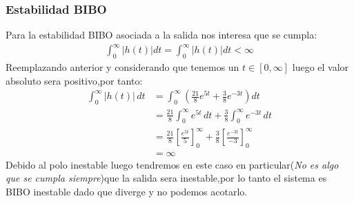 \documentclass[
  11pt,
  letterpaper,
   addpoints,
  answers
  ]{exam}
\begin{document}
\begin{questions}
\begin{solution}
    \subsubsection*{Estabilidad BIBO}
    Para la estabilidad BIBO asociada a la salida nos interesa que se cumpla:
    \begin{align}
        \int_{0}^{\infty}|h(t)|dt= \int_{0}^{\infty} |h(t)| dt < \infty
    \end{align}
    Reemplazando anterior y considerando que tenemos un $t \in [0,\infty]$ luego el valor absoluto sera positivo,por tanto:
    \begin{align}
        \int_{0}^{\infty} |h(t)| \, dt &= \int_{0}^{\infty} \left( \frac{21}{8} e^{5t} + \frac{3}{8} e^{-3t} \right) dt \\
        &= \frac{21}{8} \int_{0}^{\infty} e^{5t} \, dt + \frac{3}{8} \int_{0}^{\infty} e^{-3t} \, dt \\
        &= \frac{21}{8} \left[ \frac{e^{5t}}{5} \right]_{0}^{\infty} + \frac{3}{8} \left[ \frac{e^{-3t}}{-3} \right]_{0}^{\infty} \\
        &= \infty
    \end{align}
    Debido al polo inestable luego tendremos en este caso en particular(\textit{No es algo que se cumpla siempre})que la salida sera inestable,por lo tanto el sistema es BIBO inestable dado que diverge y no podemos acotarlo.

\end{solution}
\end{questions}
\end{document}
